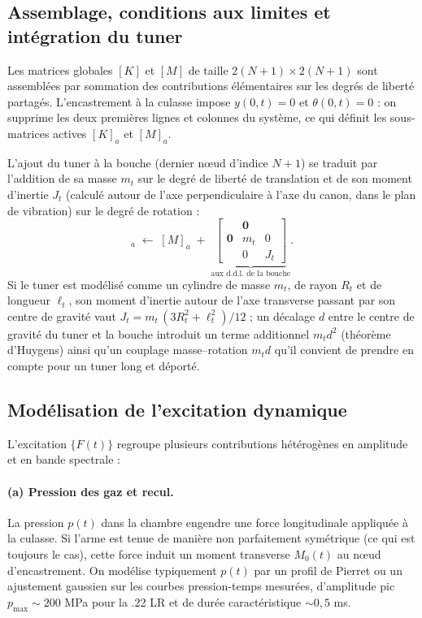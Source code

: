 \documentclass[12pt,a4paper]{article}
\begin{document}
	\subsection{Assemblage, conditions aux limites et intégration du tuner}

	Les matrices globales $[K]$ et $[M]$ de taille $2(N+1) \times 2(N+1)$ sont assemblées par sommation des contributions élémentaires sur les degrés de liberté partagés. L'encastrement à la culasse impose $y(0,t)=0$ et $\theta(0,t)=0$ : on supprime les deux premières lignes et colonnes du système, ce qui définit les sous-matrices actives $[K]_a$ et $[M]_a$.

	L'ajout du tuner à la bouche (dernier n\oe ud d'indice $N+1$) se traduit par l'addition de sa masse $m_t$ sur le degré de liberté de translation et de son moment d'inertie $J_t$ (calculé autour de l'axe perpendiculaire à l'axe du canon, dans le plan de vibration) sur le degré de rotation :
	\begin{equation}
		[M]_a \;\longleftarrow\; [M]_a \;+\;
		\underbrace{\begin{bmatrix}
				& \mathbf{0} & \\[2pt]
				\mathbf{0} & m_t & 0 \\[2pt]
				& 0 & J_t
		\end{bmatrix}}_{\text{aux d.d.l. de la bouche}}.
	\end{equation}
	Si le tuner est modélisé comme un cylindre de masse $m_t$, de rayon $R_t$ et de longueur $\ell_t$, son moment d'inertie autour de l'axe transverse passant par son centre de gravité vaut
	\(J_t = m_t\,(3R_t^2 + \ell_t^2)/12\) ; un décalage $d$ entre le centre de gravité du tuner et la bouche introduit un terme additionnel $m_t d^2$ (théorème d'Huygens) ainsi qu'un couplage masse--rotation $m_t d$ qu'il convient de prendre en compte pour un tuner long et déporté.

	\subsection{Modélisation de l'excitation dynamique}
	\label{sec:excitation}

	L'excitation $\{F(t)\}$ regroupe plusieurs contributions hétérogènes en amplitude et en bande spectrale :

	\paragraph{(a) Pression des gaz et recul.} La pression $p(t)$ dans la chambre engendre une force longitudinale appliquée à la culasse. Si l'arme est tenue de manière non parfaitement symétrique (ce qui est toujours le cas), cette force induit un moment transverse $M_0(t)$ au n\oe ud d'encastrement. On modélise typiquement $p(t)$ par un profil de Pierret ou un ajustement gaussien sur les courbes pression-temps mesurées, d'amplitude pic $p_{\max} \sim 200$ MPa pour la .22 LR et de durée caractéristique $\sim 0{,}5$ ms.
\end{document}

